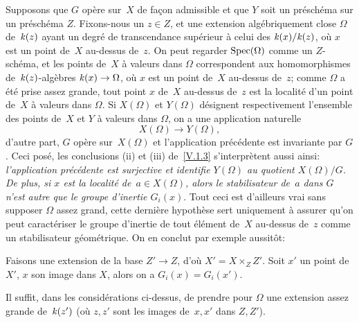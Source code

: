 Supposons que $G$ op\`ere sur~$X$ de fa\c con admissible et que
$Y$ soit un pr\'esch\'ema sur un pr\'esch\'ema
$Z$. Fixons-nous un $z\in Z$, et une extension alg\'ebriquement
close $\Omega$
de~$\mathit{k}(z)$ ayant un degr\'e de transcendance
sup\'erieur \`a celui des $\mathit{k}(x)/\mathit{k}(z)$, o\`u $x$ est un
point de~$X$ au-dessus de~$z$. On peut regarder $\operatorname{Spec}(\Omega)$ comme
un $Z$-sch\'ema, et les points de~$X$ \`a valeurs dans $\Omega$
correspondent aux homomorphismes
de~$\mathit{k}(z)$-alg\`ebres $\kres(x)\to\Omega$,
o\`u $x$ est un point de~$X$ au-dessus de~$z$;
comme $\Omega$ a \'et\'e prise assez grande, tout point $x$ de~$X$
au-dessus de~$z$ est la localit\'e d'un point de~$X$ \`a valeurs
dans $\Omega$. Si $X(\Omega)$ et $Y(\Omega)$ d\'esignent
respectivement l'ensemble des points de~$X$ et $Y$ \`a valeurs dans
$\Omega$, on a une application naturelle
$$
X(\Omega)\to Y(\Omega),
$$
d'autre part, $G$ op\`ere sur~$X(\Omega)$ et l'application
pr\'ec\'edente est invariante par $G$. Ceci pos\'e, les
conclusions (ii) et (iii) de~\ref{V.1.3} s'interpr\`etent aussi
ainsi: \emph{l'application précédente est surjective et
identifie $Y(\Omega)$ au quotient $X(\Omega)/G$. De plus, si $x$ est
la localité de~$a\in X(\Omega)$, alors le stabilisateur de~$a$
dans $G$ n'est autre que le groupe d'inertie $G_i(x)$}. Tout ceci est
d'ailleurs vrai sans supposer $\Omega$ \og assez grand\fg, cette
derni\`ere hypoth\`ese sert uniquement \`a assurer qu'on peut
caract\'eriser le groupe d'inertie de tout \'el\'ement de~$X$
au-dessus de~$z$ comme un stabilisateur \og g\'eom\'etrique\fg. On en
conclut par exemple aussit\^ot:
\begin{proposition}
\label{V.2.1}
Faisons une extension de la base $Z'\to Z$, d'o\`u
$X'=X\times_ZZ'$. Soit $x'$ un point de~$X'$, $x$ son image dans $X$,
alors on a $G_i(x)=G_i(x')$.
\end{proposition}

Il suffit, dans les consid\'erations ci-dessus, de prendre pour
$\Omega$ une extension assez grande
de~$\mathit{k}(z')$
(o\`u $z,z'$ sont les images de~$x,x'$ dans $Z,Z'$).


